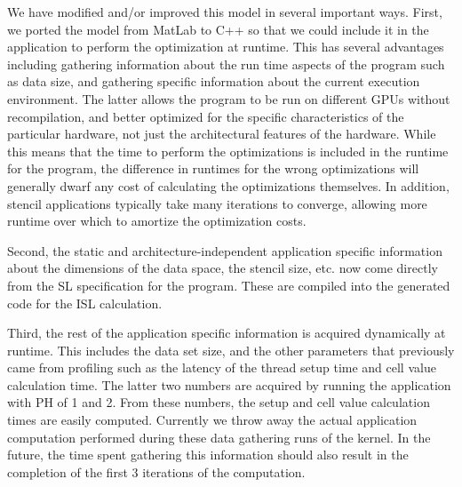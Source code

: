\documentclass{styles/sig-alternate}
\begin{document}
We have modified and/or improved this model in several important ways.  
First, we ported the model from MatLab to C++ so that we could include it in the application 
to perform the optimization at runtime.  This has several advantages including gathering 
information about the run time aspects of the program such as data size, 
and gathering specific information about the current execution environment.  
The latter allows the program to be run on different GPUs without recompilation, 
and better optimized for the specific characteristics of the particular hardware, 
not just the architectural features of the hardware.  While this means that the time 
to perform the optimizations is included in the runtime for the program, the difference 
in runtimes for the wrong optimizations will generally dwarf any cost of calculating the 
optimizations themselves.  In addition, stencil applications typically take many 
iterations to converge, allowing more runtime over which to amortize the optimization costs.

Second, the static and architecture-independent application specific information about the 
dimensions of the data space, the stencil size, etc. now come directly from the SL specification for the program.  
These are compiled into the generated code for the ISL calculation.

Third, the rest of the application specific information is acquired dynamically at runtime.  
This includes the data set size, and the other parameters that previously came from profiling 
such as the latency of the thread setup time and cell value calculation time.  The latter two 
numbers are acquired by running the application with PH of 1 and 2. From these numbers, 
the setup and cell value calculation times are easily computed.  Currently we throw away the actual 
application computation performed during these data gathering runs of the kernel.  
In the future, the time spent gathering this information should also result in the 
completion of the first 3 iterations of the computation.
\end{document}
